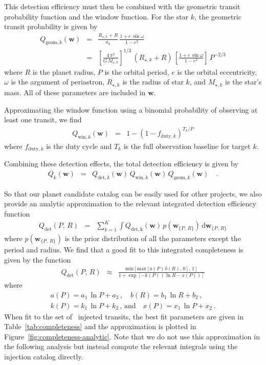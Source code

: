 \documentclass[manuscript, letterpaper]{aastex6}
\newcommand{\dfmfigref}[1]{\ref{fig:#1}}
\newcommand{\dfmFig}[1]{Figure~\dfmfigref{#1}}
\newcommand{\dfmfig}[1]{\dfmFig{#1}}
\newcommand{\dd}{\ensuremath{\,\mathrm{d}}}
\newcommand{\bvec}[1]{{\ensuremath{\boldsymbol{#1}}}}
\newcommand{\params}{{\ensuremath{\bvec{w}}}}
\begin{document}
This detection efficiency must then be combined with the geometric transit
probability function and the window function.
For the star $k$, the geometric transit probability is given by
\citep{Winn:2010}
\begin{eqnarray}
Q_{\mathrm{geom},k} (\params) &=& \frac{R_{\star,k} + R}{a_k}
    \, \frac{1 + e\,\sin\omega}{1-e^2} \\
&=& \left[\frac{4\,\pi^2}{G\,M_{\star,k}}\right]^{1/3}\,(R_{\star,k}+R)
    \, \left[\frac{1 + e\,\sin \omega}{1-e^2}\right]
    \, P^{-2/3}
\end{eqnarray}
where $R$ is the planet radius, $P$ is the orbital period, $e$ is the orbital
eccentricity, $\omega$ is the argument of periastron, $R_{\star,k}$ is
the radius of star $k$, and $M_{\star,k}$ is the star's mass.
All of these parameters are included in \params.

Approximating the window function using a binomial probability of observing
at least one transit, we find \citep[following][]{Burke:2014a}
\begin{eqnarray}
Q_{\mathrm{win},k} (\params) &=& 1 - (1 - f_{\mathrm{duty},k})^{T_k/P}
\end{eqnarray}
where $f_{\mathrm{duty},k}$ is the duty cycle and $T_k$ is the full
observation baseline for target $k$.

Combining these detection effects, the total detection efficiency is given by
\begin{eqnarray}
Q_k(\params) &=& Q_{\mathrm{det},k}(\params) \,
                 Q_{\mathrm{win},k} (\params) \,
                 Q_{\mathrm{geom},k} (\params) \quad.
\end{eqnarray}

So that our planet candidate catalog can be easily used for other projects, we
also provide an analytic approximation to the relevant integrated detection
efficiency function
\begin{eqnarray}
Q_\mathrm{det}(P,\,R) &=& \sum_{k=1}^{K} \int Q_\mathrm{det,k}(\params)\,
    p(\params_{\{P,\,R\}}) \dd\params_{\{P,\,R\}}
\end{eqnarray}
where $p(\params_{\{P,\,R\}})$ is the prior distribution of all the parameters
except the period and radius.
We find that a good fit to this integrated completeness is given by the
function
\begin{eqnarray}
Q_\mathrm{det}(P,\,R) &\approx&
    \frac{\mathrm{min}[\mathrm{max}[a(P)\,b(R),\,0],\,1]}
         {1+\exp\left[-k(P)\,(\ln R-x(P))\right]}
\end{eqnarray}
where
\begin{eqnarray}
a(P) = a_1\,\ln P + a_2 \,,\quad
b(R) = b_1\,\ln R + b_2 \,,\quad \\
k(P) = k_1\,\ln P + k_2 \,,\,\mathrm{and}\quad
x(P) = x_1\,\ln P + x_2 \,.
\end{eqnarray}
When fit to the set of \numinjs\ injected transits, the best fit parameters
are given in Table~\ref{tab:completeness} and the approximation is plotted
in \dfmfig{completeness-analytic}.
Note that we do not use this approximation in the following analysis but
instead compute the relevant integrals using the injection catalog directly.
\end{document}
